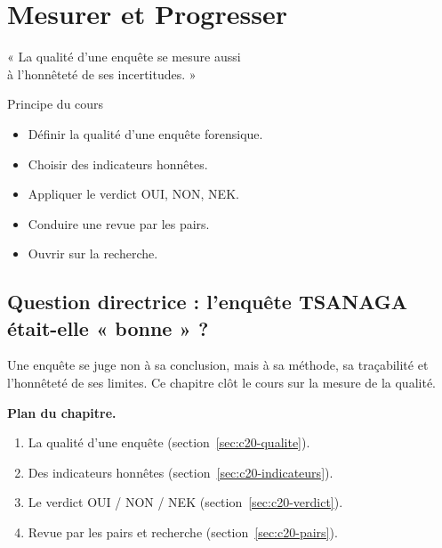 
\chapter{Mesurer et Progresser}
\label{chap:mesurer}

\epigraph{%
    « La qualité d'une enquête se mesure aussi\\
    à l'honnêteté de ses incertitudes. »%
}{Principe du cours}


\begin{boxobjectifs}
\begin{itemize}
    \item Définir la qualité d'une enquête forensique.
    \item Choisir des indicateurs honnêtes.
    \item Appliquer le verdict OUI, NON, NEK.
    \item Conduire une revue par les pairs.
    \item Ouvrir sur la recherche.
\end{itemize}
\end{boxobjectifs}

\bigskip

\section*{Question directrice : l'enquête TSANAGA était-elle « bonne » ?}

Une enquête se juge non à sa conclusion, mais à sa méthode, sa traçabilité et
l'honnêteté de ses limites. Ce chapitre clôt le cours sur la mesure de la
qualité.

\medskip
\textbf{Plan du chapitre.}
\begin{enumerate}
    \item La qualité d'une enquête (section~\ref{sec:c20-qualite}).
    \item Des indicateurs honnêtes (section~\ref{sec:c20-indicateurs}).
    \item Le verdict OUI / NON / NEK (section~\ref{sec:c20-verdict}).
    \item Revue par les pairs et recherche (section~\ref{sec:c20-pairs}).
\end{enumerate}


